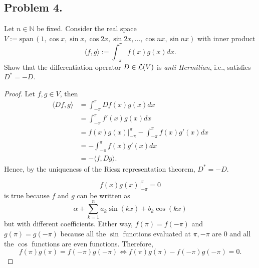 \documentclass{article}
\newcommand*{\spann}{\ensuremath{\mathrm{span}}\,}
\newcommand*{\N}{\ensuremath{\mathbb{N}}}
\begin{document}
\subsection*{Problem 4.}
Let $n\in \N$ be fixed. Consider the real space 
$V := \spann (1, \cos x, \sin x, \cos 2x, \sin 2x, \ldots, \cos nx, \sin nx)$
with inner product $$\langle f, g\rangle := \int_{-\pi}^\pi f(x) {g(x)} dx . $$ 
Show that the differentiation operator $D \in {\cal L}(V)$ is {\it anti-Hermitian}, i.e., satisfies $D^*=-D$. 
\begin{proof}
    Let $f, g\in V$, then
    \begin{align*}
        \langle Df, g\rangle & = \int_{-\pi}^\pi Df(x) g(x) dx \\
        & = \int_{-\pi}^\pi f'(x) g(x) dx \\
        & = \left. f(x)g(x) \right|_{-\pi}^\pi - \int_{-\pi}^\pi f(x) g'(x) dx \\
        & = -\int_{-\pi}^\pi f(x) g'(x) dx \\
        & = -\langle f, Dg\rangle.
    \end{align*}
    Hence, by the uniqueness of the Riesz representation theorem, $D^* = -D$.

    $$\left. f(x)g(x) \right|_{-\pi}^\pi = 0$$ is true because $f$ and $g$ can be written as 
    $$\alpha + \sum_{k=1}^{n}a_k\sin (kx) + b_k\cos (kx)$$
    but with different coefficients. Either way, $f(\pi) = f(-\pi)$ and $g(\pi)=g(-\pi)$ because 
    all the $\sin$ functions evaluated at $\pi, -\pi$ are 0 and all the $\cos$ functions are even 
    functions. Therefore, $$f(\pi)g(\pi) = f(-\pi)g(-\pi) \iff f(\pi)g(\pi) - f(-\pi)g(-\pi) = 0.$$
\end{proof}

\newpage
\end{document}
